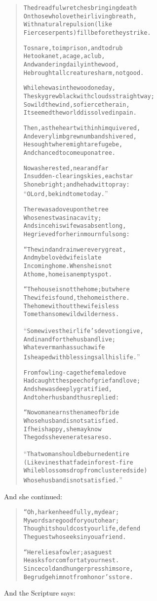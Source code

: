 \documentclass[article, twoside, 14pt]{memoir}
\renewenvironment{verbatim}{%
\begin{quote}%
\vskip -10pt%
\begin{alltt}\normalfont\large}{\end{alltt}%
\end{quote}%
\vskip -10pt
} %
\begin{document}
\begin{verbatim}
The dreadful wretches bringing death
On those who love their living breath,
With natural repulsion (like
Fierce serpents) fill before they strike.

To snare, to imprison, and to drub
He took a net, a cage, a club,
And wandering daily in the wood,
He brought all creatures harm, not good.

While he was in the wood one day,
The sky grew black with clouds straightway;
So wild the wind, so fierce the rain,
It seemed the world dissolved in pain.

Then, as the heart within him quivered,
And every limb grew numb and shivered,
He sought where might a refuge be,
And chanced to come upon a tree.

Now as he rested, near and far
In sudden-clearing skies, each star
Shone bright; and he had wit to pray:
“O Lord, be kind to me today.”

There was a dove upon the tree
Whose nest was in a cavity;
And since his wife was absent long,
He grieved for her in mournful song:

“The wind and rain were very great,
And my belovèd wife is late
In coming home. When she is not
At home, home is an empty spot.

“The house is not the home; but where
The wife is found, the home is there.
The home without the wife is less
To me than some wild wilderness.

“Some wives their life's devotion give,
And in and for the husband live;
Whatever man has such a wife
Is heaped with blessings all his life.”

From fowling-cage the female dove
Had caught the speech of grief and love;
And she was deeply gratified,
And to her husband thus replied:

“No woman earns the name of bride
Whose husband is not satisfied.
If he is happy, she may know
The gods she venerates are so.

“That woman should be burned entire
(Like vines that fade in forest-fire
While blossoms drop from clustered side)
Whose husband is not satisfied.”
\end{verbatim}
And she continued:

\begin{verbatim}
“Oh, harken heedfully, my dear;
My words are good for you to hear;
Though it should cost your life, defend
The guest who seeks in you a friend.

“Here lies a fowler; as a guest
He asks for comfort at your nest.
Since cold and hunger press him sore,
Begrudge him not from honor's store.
\end{verbatim}
And the Scripture says:
\end{document}

